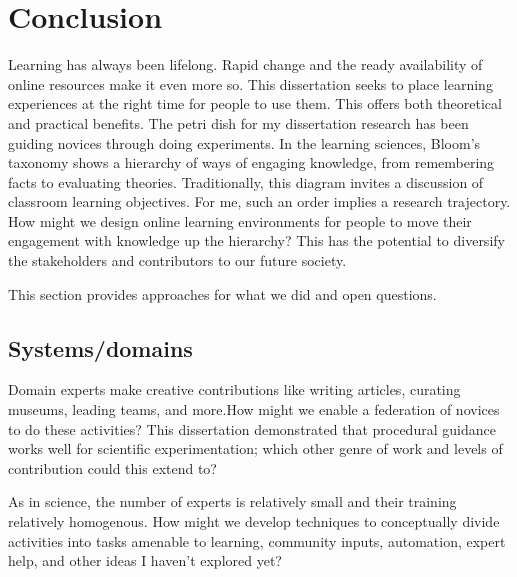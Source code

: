 
\chapter{Conclusion}

Learning has always been lifelong. Rapid change and the ready availability of online resources make it even more so. This dissertation seeks to place learning experiences at the right time for people to use them. This offers both theoretical and practical benefits. The petri dish for my dissertation research has been guiding novices through doing experiments. In the learning sciences, Bloom’s taxonomy shows a hierarchy of ways of engaging knowledge, from remembering facts to evaluating theories. Traditionally, this diagram invites a discussion of classroom learning objectives. For me, such an order implies a research trajectory. How might we design online learning environments for people to move their engagement with knowledge up the hierarchy? This has the potential to diversify the stakeholders and contributors to our future society. 

This section provides approaches for what we did and open questions.


\section{Systems/domains} 


Domain experts make creative contributions like writing articles, curating museums, leading teams, and more.How might we enable a federation of novices to do these activities? This dissertation demonstrated that procedural guidance works well for scientific experimentation; which other genre of work and levels of contribution could this extend to? 

As in science, the number of experts is relatively small and their training relatively homogenous. How might we develop techniques to conceptually divide activities into tasks amenable to learning, community inputs, automation, expert help, and other ideas I haven’t explored yet?

